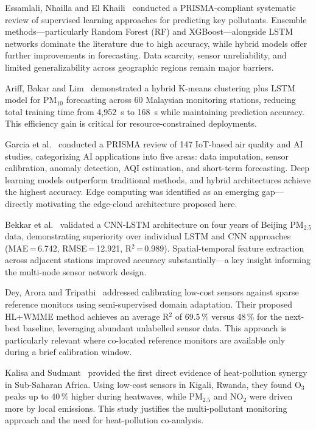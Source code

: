 Essamlali, Nhailla and El Khaili~\cite{essamlali2024} conducted a PRISMA-compliant systematic review of supervised learning approaches for predicting key pollutants. Ensemble methods—particularly Random Forest (RF) and XGBoost—alongside LSTM networks dominate the literature due to high accuracy, while hybrid models offer further improvements in forecasting. Data scarcity, sensor unreliability, and limited generalizability across geographic regions remain major barriers.

Ariff, Bakar and Lim~\cite{ariff2023} demonstrated a hybrid K-means clustering plus LSTM model for PM$_{10}$ forecasting across 60 Malaysian monitoring stations, reducing total training time from 4,952~s to 168~s while maintaining prediction accuracy. This efficiency gain is critical for resource-constrained deployments.

Garcia et al.~\cite{garcia2025} conducted a PRISMA review of 147 IoT-based air quality and AI studies, categorizing AI applications into five areas: data imputation, sensor calibration, anomaly detection, AQI estimation, and short-term forecasting. Deep learning models outperform traditional methods, and hybrid architectures achieve the highest accuracy. Edge computing was identified as an emerging gap—directly motivating the edge-cloud architecture proposed here.

Bekkar et al.~\cite{bekkar2021} validated a CNN-LSTM architecture on four years of Beijing PM$_{2.5}$ data, demonstrating superiority over individual LSTM and CNN approaches (MAE\,=\,6.742, RMSE\,=\,12.921, R$^2$\,=\,0.989). Spatial-temporal feature extraction across adjacent stations improved accuracy substantially—a key insight informing the multi-node sensor network design.

Dey, Arora and Tripathi~\cite{dey2022} addressed calibrating low-cost sensors against sparse reference monitors using semi-supervised domain adaptation. Their proposed HL+WMME method achieves an average R$^2$ of 69.5\,\% versus 48\,\% for the next-best baseline, leveraging abundant unlabelled sensor data. This approach is particularly relevant where co-located reference monitors are available only during a brief calibration window.

Kalisa and Sudmant~\cite{kalisa2024} provided the first direct evidence of heat-pollution synergy in Sub-Saharan Africa. Using low-cost sensors in Kigali, Rwanda, they found O$_3$ peaks up to 40\,\% higher during heatwaves, while PM$_{2.5}$ and NO$_2$ were driven more by local emissions. This study justifies the multi-pollutant monitoring approach and the need for heat-pollution co-analysis.


